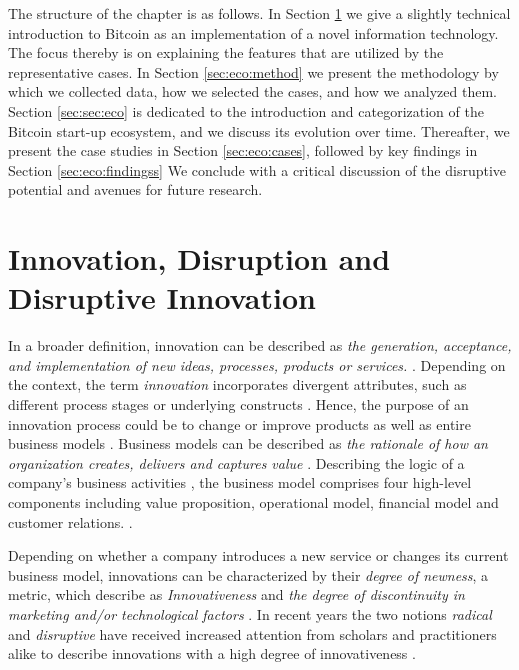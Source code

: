 The structure of the chapter is as follows. In Section \ref{sec:eco:primer} we give a slightly technical 
introduction to Bitcoin as an implementation of a novel information technology. 
The focus thereby is on explaining the features that are utilized by the representative 
cases. In Section \ref{sec:eco:method} we present the methodology by which we collected data, how 
we selected the cases, and how we analyzed them. Section \ref{sec:sec:eco} is dedicated to the 
introduction and categorization of the Bitcoin start-up ecosystem, and we discuss 
its evolution over time. Thereafter, we present the case studies in Section \ref{sec:eco:cases}, 
followed by key findings in Section \ref{sec:eco:findingss} We conclude with a critical discussion of 
the disruptive potential and avenues for future research.

\section{Innovation, Disruption and Disruptive Innovation}
\label{sec:eco:primer}

In a broader definition, innovation can be described as \emph{the generation, acceptance, 
and implementation of new ideas, processes, products or services.} \parencite[][2]{10.2307/2391646}. Depending on the context, the term \emph{innovation} incorporates divergent 
attributes, such as different process stages or underlying constructs \parencite{doi:10.1108/00251740910984578}. Hence, the purpose of an innovation process could be to change or 
improve products as well as entire business models \parencite{CAIM:CAIM637}. Business 
models can be described as \emph{the rationale of how an organization creates, delivers 
and captures value} \parencite{osterwalder2010business}. Describing the logic of a 
company's business activities \parencite{linder2000so}, the business model comprises 
four high-level components including value proposition, operational model, financial 
model and customer relations. \parencite{CAIM:CAIM637}. 

Depending on whether a company introduces a new service or changes its current 
business model, innovations can be characterized by their \emph{degree of newness}, 
a metric, which \cite{JPIM:JPIMJPIM192_0110.XML} describe as \emph{Innovativeness} and 
\emph{the degree of discontinuity in marketing and/or technological factors} \parencite[][112]{JPIM:JPIMJPIM192_0110.XML}. In recent years the two notions \emph{radical} and \emph{disruptive}
have received increased attention from scholars and practitioners alike to describe 
innovations with a high degree of innovativeness \parencite{Latzer01062009,christensen2015disruptive}. 

